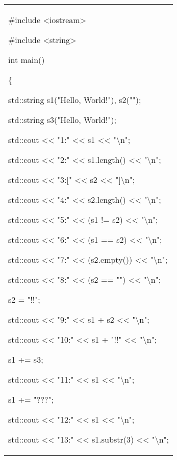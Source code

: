 \documentclass[
]{article}
\begin{document}
\begin{longtable}[]{@{}l@{}}
\toprule
\endhead
\begin{minipage}[t]{0.97\columnwidth}\raggedright
\#include \textless iostream\textgreater{}

\#include \textless string\textgreater{}

int main()

\{

std::string s1("Hello, World!"), s2("");

std::string s3("Hello, World!");

std::cout \textless\textless{} "1:" \textless\textless{} s1
\textless\textless{} "\textbackslash n";

std::cout \textless\textless{} "2:" \textless\textless{} s1.length()
\textless\textless{} "\textbackslash n";

std::cout \textless\textless{} "3:{[}" \textless\textless{} s2
\textless\textless{} "{]}\textbackslash n";

std::cout \textless\textless{} "4:" \textless\textless{} s2.length()
\textless\textless{} "\textbackslash n";

std::cout \textless\textless{} "5:" \textless\textless{} (s1 != s2)
\textless\textless{} "\textbackslash n";

std::cout \textless\textless{} "6:" \textless\textless{} (s1 == s2)
\textless\textless{} "\textbackslash n";

std::cout \textless\textless{} "7:" \textless\textless{} (s2.empty())
\textless\textless{} "\textbackslash n";

std::cout \textless\textless{} "8:" \textless\textless{} (s2 == "")
\textless\textless{} "\textbackslash n";

s2 = "!!";

std::cout \textless\textless{} "9:" \textless\textless{} s1 + s2
\textless\textless{} "\textbackslash n";

std::cout \textless\textless{} "10:" \textless\textless{} s1 + "!!"
\textless\textless{} "\textbackslash n";

s1 += s3;

std::cout \textless\textless{} "11:" \textless\textless{} s1
\textless\textless{} "\textbackslash n";

s1 += "???";

std::cout \textless\textless{} "12:" \textless\textless{} s1
\textless\textless{} "\textbackslash n";

std::cout \textless\textless{} "13:" \textless\textless{} s1.substr(3)
\textless\textless{} "\textbackslash n";


\end{minipage}
\end{longtable}
\end{document}

